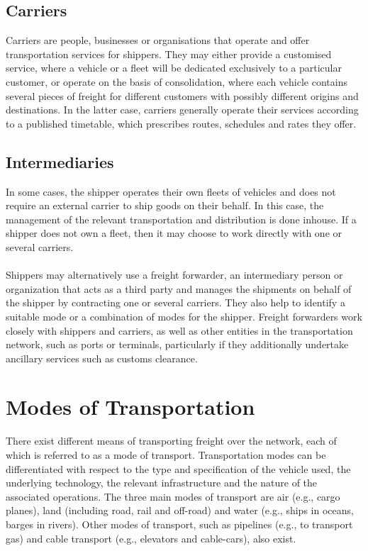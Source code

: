 \subsection{Carriers}
Carriers are people, businesses or organisations that operate and offer transportation services for shippers. They may either provide a customised service, where a vehicle or a fleet will be dedicated exclusively to a particular customer, or operate on the basis of consolidation, where each vehicle contains several pieces of freight for different customers with possibly different origins and destinations. In the latter case, carriers generally operate their services according to a published timetable, which prescribes routes, schedules and rates they offer.
\subsection{Intermediaries}
In some cases, the shipper operates their own fleets of vehicles and does not require an external carrier to ship goods on their behalf. In this case, the management of the relevant transportation and distribution is done inhouse. If a shipper does not own a fleet, then it may choose to work directly with one or several carriers.
\paragraph{}
Shippers may alternatively use a freight forwarder, an intermediary person or organization that acts as a third party and manages the shipments on behalf of the shipper by contracting one or several carriers. They also help to identify a suitable mode or a combination of modes for the shipper. Freight forwarders work closely with shippers and carriers, as well as other entities in the transportation network, such as ports or terminals, particularly if they additionally undertake ancillary services such as customs clearance.
\section{Modes of Transportation}
There exist different means of transporting freight over the network, each of which is referred to as a mode of transport. Transportation modes can be differentiated with respect to the type and specification of the vehicle used, the underlying technology, the relevant infrastructure and the nature of the associated operations. The three main modes of transport are air (e.g., cargo planes), land (including road, rail and off-road) and water (e.g., ships in oceans, barges in rivers). Other modes of transport, such as pipelines (e.g., to transport gas) and cable transport (e.g., elevators and cable-cars), also exist.
